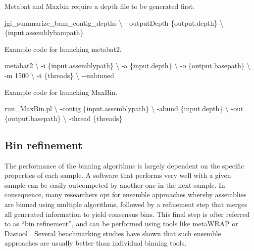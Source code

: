 \documentclass[
]{book}
\newenvironment{Shaded}{\begin{snugshade}}{\end{snugshade}}
\newcommand{\AttributeTok}[1]{\textcolor[rgb]{0.77,0.63,0.00}{#1}}
\newcommand{\DataTypeTok}[1]{\textcolor[rgb]{0.13,0.29,0.53}{#1}}
\newcommand{\ExtensionTok}[1]{#1}
\newcommand{\NormalTok}[1]{#1}
\begin{document}
Metabat and Maxbin require a depth file to be generated first.

\begin{Shaded}
\begin{Highlighting}[]
\ExtensionTok{jgi\_summarize\_bam\_contig\_depths} \DataTypeTok{\textbackslash{}}
    \AttributeTok{{-}{-}outputDepth}\NormalTok{ \{output.depth\} }\DataTypeTok{\textbackslash{}}
\NormalTok{    \{input.assemblybampath\}}
\end{Highlighting}
\end{Shaded}

Example code for launching metabat2.

\begin{Shaded}
\begin{Highlighting}[]
\ExtensionTok{metabat2} \DataTypeTok{\textbackslash{}}
    \AttributeTok{{-}i}\NormalTok{ \{input.assemblypath\} }\DataTypeTok{\textbackslash{}}
    \AttributeTok{{-}a}\NormalTok{ \{input.depth\} }\DataTypeTok{\textbackslash{}}
    \AttributeTok{{-}o}\NormalTok{ \{output.basepath\} }\DataTypeTok{\textbackslash{}}
    \AttributeTok{{-}m}\NormalTok{ 1500 }\DataTypeTok{\textbackslash{}}
    \AttributeTok{{-}t}\NormalTok{ \{threads\} }\DataTypeTok{\textbackslash{}}
    \AttributeTok{{-}{-}unbinned}
\end{Highlighting}
\end{Shaded}

Example code for launching MaxBin.

\begin{Shaded}
\begin{Highlighting}[]
\ExtensionTok{run\_MaxBin.pl} \DataTypeTok{\textbackslash{}}
    \AttributeTok{{-}contig}\NormalTok{ \{input.assemblypath\} }\DataTypeTok{\textbackslash{}}
    \AttributeTok{{-}abund}\NormalTok{ \{input.depth\} }\DataTypeTok{\textbackslash{}}
    \AttributeTok{{-}out}\NormalTok{ \{output.basepath\} }\DataTypeTok{\textbackslash{}}
    \AttributeTok{{-}thread}\NormalTok{ \{threads\}}
\end{Highlighting}
\end{Shaded}

\hypertarget{genome-resolved-refinement}{%
\subsection*{Bin refinement}\label{genome-resolved-refinement}}

The performance of the binning algorithms is largely dependent on the specific properties of each sample. A software that performs very well with a given sample can be easily outcompeted by another one in the next sample. In consequence, many researchers opt for ensemble approaches whereby assemblies are binned using multiple algorithms, followed by a refinement step that merges all generated information to yield consensus bins. This final step is ofter referred to as ``bin refinement'', and can be performed using tools like metaWRAP \citep{Uritskiy2018-my} or Dastool \citep{Sieber2018-fp}. Several benchmarking studies have shown that such ensemble approaches are usually better than individual binning tools.
\end{document}
